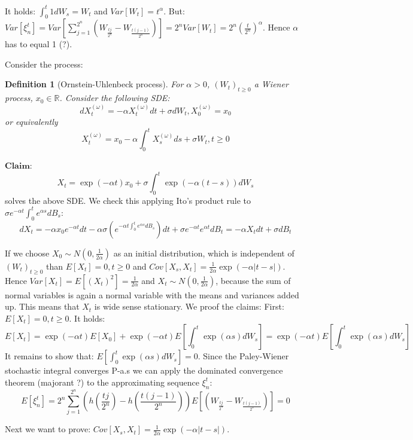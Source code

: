 \documentclass[%
thesis=student,%
coverpage=false,%
titlepage=false,%
headmarks=true, %
german,%
font=libertine, %
math=newpxtx, %
BCOR=5mm,%
coverBCOR=11mm%
]{tumbook}
\newtheorem{definition}{Definition}[section]
\begin{document}
It holds: $\int_{0}^{t} 1 dW_{s} = W_{t}$ and $Var[W_{t}] = t^{\alpha}$. But: 
$Var[\xi_{n}^{t}] = Var\left[\sum_{j=1}^{2^{n}}\left(W_{\frac{tj}{2^{n}}} - W_{\frac{t(j-1)}{2^{n}}}\right)\right] = 2^{n}Var\left[W_{t}\right] = 2^{n}\left(\frac{t}{2^{n}}\right)^{\alpha}$. Hence $\alpha$ has to equal 1 (?).

Consider the process:

\begin{definition}[Ornstein-Uhlenbeck process] 
For $\alpha > 0$, $(W_{t})_{t\geq 0}$ a Wiener process, $x_{0} \in \mathbb{R}$. Consider the following SDE:
\[
dX_{t}^{(\omega)} = -\alpha X_{t}^{(\omega)} dt + \sigma dW_{t}, X_{0}^{(\omega)} = x_{0}
\]
or equivalently
\[
X_{t}^{(\omega)} = x_{0} - \alpha\int_{0}^{t}X_{s}^{(\omega)}ds + \sigma W_{t}, t \geq 0
\]  
\end{definition}

$\textbf{Claim}$: 
\[
X_{t} = \exp(-\alpha t)x_{0} + \sigma\int_{0}^{t}\exp(-\alpha (t-s))dW_{s}
\]
solves the above SDE. We check this applying Ito's product rule to $\sigma e^{-\alpha t}\int_{0}^{t}e^{\alpha s}dB_{s}$:
\[
dX_{t} = -\alpha x_{0}e^{-\alpha t}dt - \alpha\sigma(e^{-\alpha t \int_{0}^{t}e^{\alpha s}dB_{s}})dt + \sigma e^{-\alpha t}e^{\alpha t}dB_{t} = -\alpha X_{t} dt + \sigma dB_{t}
\]

If we choose $X_{0} \sim N(0,\frac{1}{2\alpha})$ as an initial distribution, which is independent of $(W_{t})_{t\geq 0}$ than $E[X_{t}] = 0, t \geq 0$ and $Cov[X_{s},X_{t}] = \frac{1}{2\alpha}\exp(-\alpha\lvert t-s \rvert)$. Hence $Var[X_{t}]=E[(X_{t})^{2}]=\frac{1}{2\alpha}$ and $X_{t} \sim N(0,\frac{1}{2\alpha})$, because the sum of normal variables is again a normal variable with the means and variances added up. This means that $X_{t}$ is wide sense stationary. We proof the claims:
First: $E[X_{t}] = 0, t \geq 0$. It holds: 
\[
E[X_{t}] = \exp(-\alpha t)E[X_{0}] + \exp(-\alpha t)E[\int_{0}^{t} \exp(\alpha s) dW_{s}] = \exp(-\alpha t)E[\int_{0}^{t} \exp(\alpha s) dW_{s}]
\]
It remains to show that: $E[\int_{0}^{t} \exp(\alpha s) dW_{s}] = 0$.
Since the Paley-Wiener stochastic integral converges P-a.s we can apply the dominated convergence theorem (majorant ?) to the approximating sequence $\xi_{n}^{t}$: 
\[
E[\xi_{n}^{t}] = 2^{n}\sum_{j=1}^{2^{n}}(h(\frac{tj}{2^{n}})-h(\frac{t(j-1)}{2^{n}}))E[(W_{\frac{tj}{2^{n}}}-W_{\frac{t(j-1)}{2^{n}}})] = 0 
\]

Next we want to prove: $Cov[X_{s},X_{t}] = \frac{1}{2\alpha}\exp(-\alpha \lvert t-s \rvert)$. 
\end{document}
